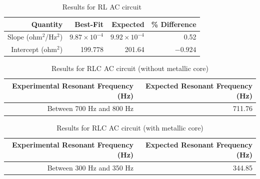 \begin{table}[ht]
	\begin{center}
		\begin{tabular}{|r|r|r|r|}
			\hline
			Quantity & Best-Fit & Expected & \% Difference \\
			\hline
			Slope (ohm$^{2}$/Hz$^{2}$) & $9.87 \times 10^{-4}$ & $9.92 \times 10^{-4}$ & 0.52 \\
			Intercept (ohm$^{2}$) & 199.778 & 201.64 & $-0.924$ \\
			\hline
		\end{tabular}
	\end{center}
	\caption{Results for RL AC circuit}
	\label{table.results.RL}
\end{table}
\begin{table}[ht]
	\begin{center}
		\begin{tabular}{|r|r|}
			\hline
			Experimental Resonant Frequency (Hz) & Expected Resonant Frequency (Hz) \\
			\hline
			Between 700 Hz and 800 Hz & 711.76 \\
			\hline
		\end{tabular}
	\end{center}
	\caption{Results for RLC AC circuit (without metallic core)}
	\label{table.results.RLC}
\end{table}
\begin{table}[ht]
	\begin{center}
		\begin{tabular}{|r|r|}
			\hline
			Experimental Resonant Frequency (Hz) & Expected Resonant Frequency (Hz) \\
			\hline
			Between 300 Hz and 350 Hz & 344.85 \\
			\hline
		\end{tabular}
	\end{center}
	\caption{Results for RLC AC circuit (with metallic core)}
	\label{table.results.RLCcore}
\end{table}
\newpage
\FloatBarrier
